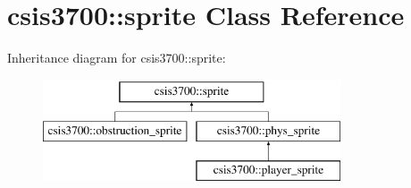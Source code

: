 \hypertarget{classcsis3700_1_1sprite}{}\section{csis3700\+:\+:sprite Class Reference}
\label{classcsis3700_1_1sprite}
Inheritance diagram for csis3700\+:\+:sprite\+:\begin{figure}[H]
\begin{center}
\leavevmode
\includegraphics[height=3.000000cm]{classcsis3700_1_1sprite}
\end{center}
\end{figure}
